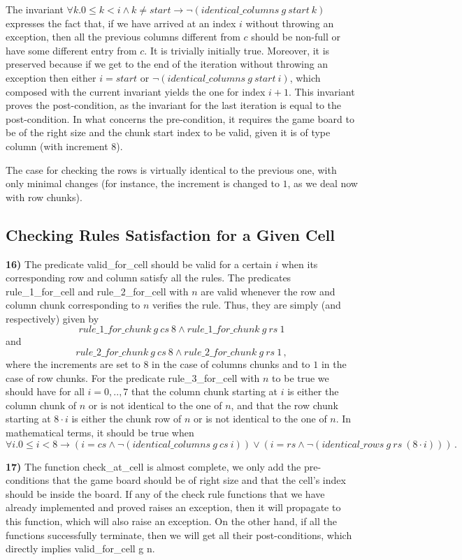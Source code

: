 \documentclass[]{StandardTemplate}
\begin{document}
The invariant $ \forall k. 0 \leq k < i \land k \neq start \to \neg (identical\_columns~g~start~k) $ expresses the fact that, if we have arrived at an index $ i $ without throwing an exception, then all the previous columns different from $ c $ should be non-full or have some different entry from $ c $. It is trivially initially true. Moreover, it is preserved because if we get to the end of the iteration without throwing an exception then either $ i = start $ or $  \neg (identical\_columns~g~start~i) $, which composed with the current invariant yields the one for index $ i+1 $. This invariant proves the post-condition, as the invariant for the last iteration is equal to the post-condition. In what concerns the pre-condition, it requires the game board to be of the right size and the chunk start index to be valid, given it is of type column (with increment $ 8 $).

The case for checking the rows is virtually identical to the previous one, with only minimal changes (for instance, the increment is changed to $ 1 $, as we deal now with row chunks). 


\subsection{Checking Rules Satisfaction for a Given Cell}
\label{subsec:gc}

\textbf{16)} The predicate valid\_for\_cell should be valid for a certain $ i $ when its corresponding row and column satisfy all the rules. The predicates rule\_1\_for\_cell and rule\_2\_for\_cell with $ n $ are valid whenever the row and column chunk corresponding to $ n $ verifies the rule. Thus, they are simply (and respectively) given by \[
rule\_1\_for\_chunk~g~cs~8 \land rule\_1\_for\_chunk~g~rs~1
\]and \[
rule\_2\_for\_chunk~g~cs~8 \land rule\_2\_for\_chunk~g~rs~1
  \,,\] where the increments are set to $ 8 $ in the case of columns chunks and to $ 1 $ in the case of row chunks. For the predicate rule\_3\_for\_cell with $ n $ to be true we should have for all $ i=0,..,7 $ that the column chunk starting at $ i $ is either the column chunk of $ n $ or is not identical to the one of $ n $, and that the row chunk starting at $ 8 \cdot i $ is either the chunk row of $ n $ or is not identical to the one of $ n $. In mathematical terms, it should be true when \[
\forall i. 0 \leq i < 8 \to (i = cs \land \neg(identical\_columns~g~cs~i))\lor(i = rs \land \neg(identical\_rows~g~rs~(8 \cdot i)))
\,.\]

\textbf{17)} The function check\_at\_cell is almost complete, we only add the pre-conditions that the game board should be of right size and that the cell's index should be inside the board. If any of the check rule functions that we have already implemented and proved raises an exception, then it will propagate to this function, which will also raise an exception. On the other hand, if all the functions successfully terminate, then we will get all their post-conditions, which directly implies valid\_for\_cell g n.
\end{document}
